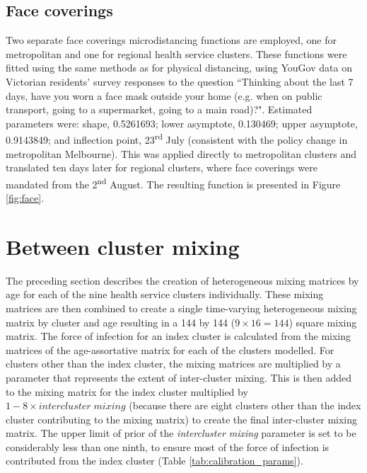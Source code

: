 \subsection{Face coverings}
Two separate face coverings microdistancing functions are employed, one for metropolitan and one for regional health service clusters. These functions were fitted using the same methods as for physical distancing, using YouGov data on Victorian residents' survey responses to the question ``Thinking about the last 7 days, have you worn a face mask outside your home (e.g. when on public transport, going to a supermarket, going to a main road)?". Estimated parameters were: shape, 0.5261693; lower asymptote, 0.130469; upper asymptote, 0.9143849; and inflection point, 23\textsuperscript{rd} July (consistent with the policy change in metropolitan Melbourne). This was applied directly to metropolitan clusters and translated ten days later for regional clusters, where face coverings were mandated from the 2\textsuperscript{nd} August. The resulting function is presented in Figure \ref{fig:face}.


\section{Between cluster mixing}
The preceding section describes the creation of heterogeneous mixing matrices by age for each of the nine health service clusters individually. These mixing matrices are then combined to create a single time-varying heterogeneous mixing matrix by cluster and age resulting in a 144 by 144 (\(9\times16=144\)) square mixing matrix. The force of infection for an index cluster is calculated from the mixing matrices of the age-assortative matrix for each of the clusters modelled. For clusters other than the index cluster, the mixing matrices are multiplied by a parameter that represents the extent of inter-cluster mixing. This is then added to the mixing matrix for the index cluster multiplied by \(1-8\times intercluster\;mixing\) (because there are eight clusters other than the index cluster contributing to the mixing matrix) to create the final inter-cluster mixing matrix. The upper limit of prior of the \textit{intercluster mixing} parameter is set to be considerably less than one ninth, to ensure most of the force of infection is contributed from the index cluster (Table \ref{tab:calibration_params}).
